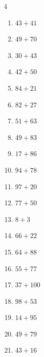 \begin{multicols}{4}
\begin{enumerate}
  \item $43+41$
        \phantom{$=84$}

  \item $49+70$
        \phantom{$=119$}

  \item $30+43$
        \phantom{$=73$}

  \item $42+50$
        \phantom{$=92$}

  \item $84+21$
        \phantom{$=105$}

  \item $82+27$
        \phantom{$=109$}

  \item $51+63$
        \phantom{$=114$}

  \item $49+83$
        \phantom{$=132$}

  \item $17+86$
        \phantom{$=103$}

  \item $94+78$
        \phantom{$=172$}

  \item $97+20$
        \phantom{$=117$}

  \item $77+50$
        \phantom{$=127$}

  \item $8+3$
        \phantom{$=11$}

  \item $66+22$
        \phantom{$=88$}

  \item $64+88$
        \phantom{$=152$}

\columnbreak %

  \item $55+77$
        \phantom{$=132$}

  \item $37+100$
        \phantom{$=137$}

  \item $98+53$
        \phantom{$=151$}

  \item $14+95$
        \phantom{$=109$}

  \item $49+79$
        \phantom{$=128$}

  \item $43+16$
        \phantom{$=59$}


\end{enumerate}
\end{multicols}
